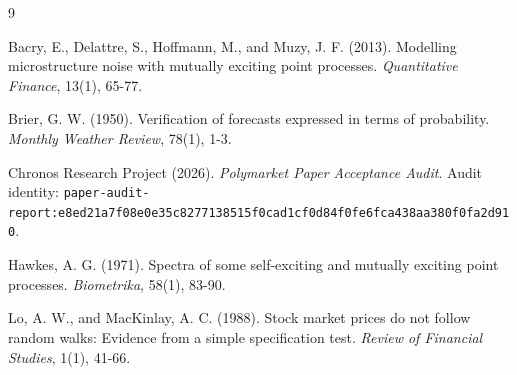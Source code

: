 \documentclass[10pt,twoside]{article}
\begin{document}
\begin{thebibliography}{9}

Bacry, E., Delattre, S., Hoffmann, M., and Muzy, J. F. (2013).
Modelling microstructure noise with mutually exciting point processes.
\emph{Quantitative Finance}, 13(1), 65-77.

Brier, G. W. (1950).
Verification of forecasts expressed in terms of probability.
\emph{Monthly Weather Review}, 78(1), 1-3.

Chronos Research Project (2026).
\emph{Polymarket Paper Acceptance Audit}.
Audit identity: \nolinkurl{paper-audit-report:e8ed21a7f08e0e35c8277138515f0cad1cf0d84f0fe6fca438aa380f0fa2d910}.

Hawkes, A. G. (1971).
Spectra of some self-exciting and mutually exciting point processes.
\emph{Biometrika}, 58(1), 83-90.

Lo, A. W., and MacKinlay, A. C. (1988).
Stock market prices do not follow random walks: Evidence from a simple specification test.
\emph{Review of Financial Studies}, 1(1), 41-66.

\end{thebibliography}
\end{document}
